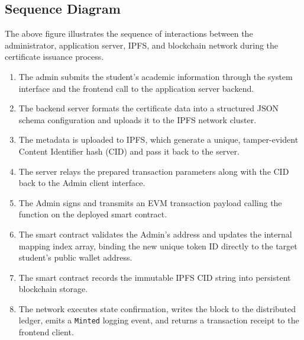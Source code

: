 \subsection{Sequence Diagram}


The above figure illustrates the sequence of interactions between the administrator, application server, IPFS, and blockchain network during the certificate issuance process.

\begin{enumerate}
    \item The admin submits the student's academic information through the system interface and the frontend call to the application server backend.

    \item The backend server formats the certificate data into a structured JSON schema configuration and uploads it to the IPFS network cluster.

    \item The metadata is uploaded to IPFS, which generate a unique, tamper-evident Content Identifier hash (CID) and pass it back to the server.

    \item The server relays the prepared transaction parameters along with the CID back to the Admin client interface.

    \item The Admin signs and transmits an EVM transaction payload calling the  function on the deployed smart contract.

    \item The smart contract validates the Admin's address and updates the internal mapping index array, binding the new unique token ID directly to the target student's public wallet address.

    \item The smart contract records the immutable IPFS CID string into persistent blockchain storage.

    \item The network executes state confirmation, writes the block to the distributed ledger, emits a \texttt{Minted} logging event, and returns a transaction receipt to the frontend client.
\end{enumerate}
